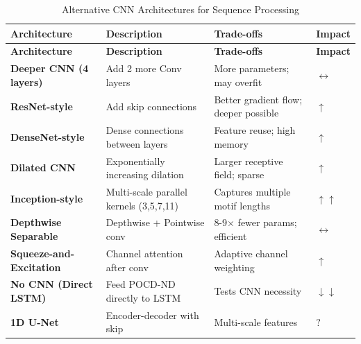 \documentclass[11pt,a4paper]{article}
\begin{document}
\begin{longtable}{L{3cm}L{4cm}L{4cm}C{1.5cm}}
\caption{Alternative CNN Architectures for Sequence Processing} \\
\toprule
\textbf{Architecture} & \textbf{Description} & \textbf{Trade-offs} & \textbf{Impact} \\
\midrule
\endfirsthead
\toprule
\textbf{Architecture} & \textbf{Description} & \textbf{Trade-offs} & \textbf{Impact} \\
\midrule
\endhead
\bottomrule
\endlastfoot

\textbf{Deeper CNN (4 layers)} & Add 2 more Conv layers & More parameters; may overfit & \textcolor{neutral}{$\leftrightarrow$} \\

\textbf{ResNet-style} & Add skip connections & Better gradient flow; deeper possible & \textcolor{positive}{$\uparrow$} \\

\textbf{DenseNet-style} & Dense connections between layers & Feature reuse; high memory & \textcolor{positive}{$\uparrow$} \\

\textbf{Dilated CNN} & Exponentially increasing dilation & Larger receptive field; sparse & \textcolor{positive}{$\uparrow$} \\

\textbf{Inception-style} & Multi-scale parallel kernels (3,5,7,11) & Captures multiple motif lengths & \textcolor{positive}{$\uparrow\uparrow$} \\

\textbf{Depthwise Separable} & Depthwise + Pointwise conv & 8-9$\times$ fewer params; efficient & \textcolor{neutral}{$\leftrightarrow$} \\

\textbf{Squeeze-and-Excitation} & Channel attention after conv & Adaptive channel weighting & \textcolor{positive}{$\uparrow$} \\

\textbf{No CNN (Direct LSTM)} & Feed POCD-ND directly to LSTM & Tests CNN necessity & \textcolor{negative}{$\downarrow\downarrow$} \\

\textbf{1D U-Net} & Encoder-decoder with skip & Multi-scale features & \textcolor{uncertain}{$?$} \\

\end{longtable}
\end{document}
